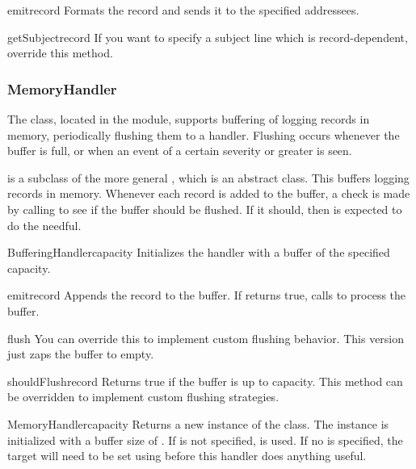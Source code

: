 \begin{methoddesc}{emit}{record}
Formats the record and sends it to the specified addressees.
\end{methoddesc}

\begin{methoddesc}{getSubject}{record}
If you want to specify a subject line which is record-dependent,
override this method.
\end{methoddesc}

\subsubsection{MemoryHandler}

The  class, located in the
 module, supports buffering of logging
records in memory, periodically flushing them to a 
handler. Flushing occurs whenever the buffer is full, or when an event
of a certain severity or greater is seen.

 is a subclass of the more general
, which is an abstract class. This buffers logging
records in memory. Whenever each record is added to the buffer, a
check is made by calling  to see if the buffer
should be flushed.  If it should, then  is expected to
do the needful.

\begin{classdesc}{BufferingHandler}{capacity}
Initializes the handler with a buffer of the specified capacity.
\end{classdesc}

\begin{methoddesc}{emit}{record}
Appends the record to the buffer. If  returns true,
calls  to process the buffer.
\end{methoddesc}

\begin{methoddesc}{flush}{}
You can override this to implement custom flushing behavior. This version
just zaps the buffer to empty.
\end{methoddesc}

\begin{methoddesc}{shouldFlush}{record}
Returns true if the buffer is up to capacity. This method can be
overridden to implement custom flushing strategies.
\end{methoddesc}

\begin{classdesc}{MemoryHandler}{capacity}
Returns a new instance of the  class. The
instance is initialized with a buffer size of . If
 is not specified,  is used. If no
 is specified, the target will need to be set using
 before this handler does anything useful.
\end{classdesc}


